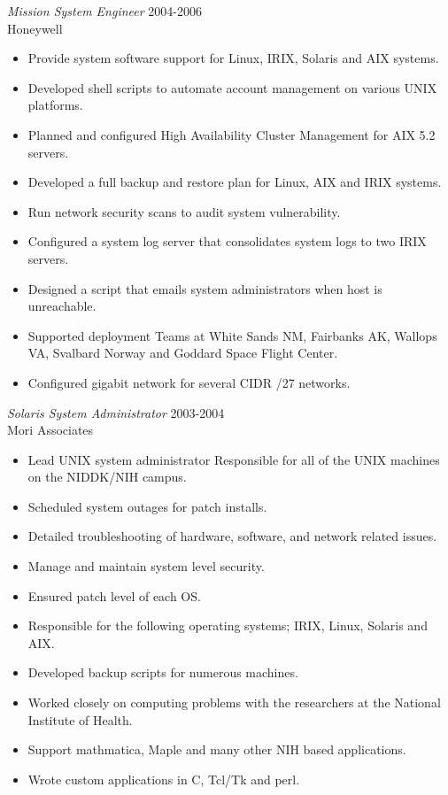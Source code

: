 \documentclass[margin, 10pt]{res} %
\begin{document}
\begin{resume}
{\sl Mission System Engineer } \hfill 2004-2006 \\
Honeywell
\begin{itemize}
  \item Provide system software support for Linux, IRIX, Solaris and AIX systems.
  \item Developed shell scripts to automate account management on various UNIX platforms.
  \item Planned and configured High Availability Cluster Management for AIX 5.2 servers.
  \item Developed a full backup and restore plan for Linux, AIX and IRIX systems.
  \item Run network security scans to audit system vulnerability.
  \item Configured a system log server that consolidates system logs to two IRIX servers.
  \item Designed a script that emails system administrators when host is unreachable.
  \item Supported deployment Teams at White Sands NM, Fairbanks AK, Wallops VA, Svalbard Norway and Goddard Space Flight Center.
  \item Configured gigabit network for several CIDR /27 networks.
\end{itemize}

{\sl Solaris System Administrator} \hfill 2003-2004 \\
Mori Associates
\begin{itemize}
  \item Lead UNIX system administrator Responsible for all of the UNIX machines on the NIDDK/NIH campus.
  \item Scheduled system outages for patch installs.
  \item Detailed troubleshooting of hardware, software, and network related issues.
  \item Manage and maintain system level security.
  \item Ensured patch level of each OS.
  \item Responsible for the following operating systems; IRIX, Linux, Solaris and AIX.
  \item Developed backup scripts for numerous machines.
  \item Worked closely on computing problems with the researchers at the National Institute of Health.
  \item Support mathmatica, Maple and many other NIH based applications.
  \item Wrote custom applications in C, Tcl/Tk and perl.
\end{itemize}


\end{resume}
\end{document}
